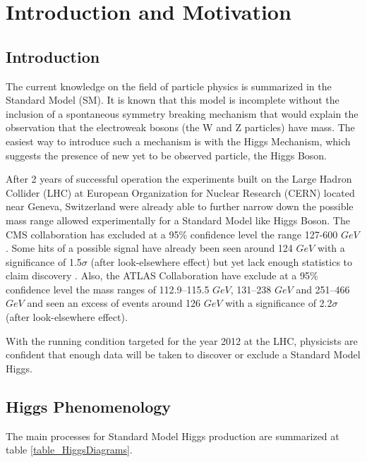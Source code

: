 \documentclass[%
 reprint,
 amsmath,
 amssymb,
 aps,
 pra,
 showkeys
]{revtex4-1}
\begin{document}
\setlength{\unitlength}{1mm}

\section{Introduction and Motivation}

\subsection{Introduction}

The current knowledge on the field of particle physics is summarized in the Standard Model (SM). It is known that this model
is incomplete without the inclusion of a spontaneous symmetry breaking mechanism that would explain the observation 
that the electroweak bosons (the W and Z particles) have mass. The easiest way to introduce such a mechanism is
with the Higgs Mechanism, which suggests the presence of new yet to be observed particle, the Higgs Boson.

After 2 years of successful operation the experiments built on the Large Hadron Collider (LHC) at 
European Organization for Nuclear Research (CERN) located near Geneva, Switzerland were already able 
to further narrow down the possible mass range allowed experimentally for a Standard Model like Higgs Boson. 
The CMS collaboration has excluded at a 95\% confidence level the range 127-600 $GeV$. 
Some hits of a possible signal have already been seen around 124 $GeV$ with a significance of 1.5$\sigma$ 
(after look-elsewhere effect) but yet lack enough statistics to claim discovery
\cite{article:CMS-HIG-11-032}. Also, the ATLAS Collaboration have exclude at a 95\% confidence level the mass
ranges of 112.9–115.5 $GeV$, 131–238 $GeV$ and 251–466 $GeV$ and seen an excess of events around 126 $GeV$
with a significance of 2.2$\sigma$ (after look-elsewhere effect)\cite{article:CERN-PH-EP-2012-019}.
 
With the running condition targeted for the year 2012 at the LHC, physicists are confident that enough data will be
taken to discover or exclude a Standard Model Higgs.

\subsection{Higgs Phenomenology}

The main processes for Standard Model Higgs production are summarized at table \ref{table_HiggsDiagrams}.
\end{document}

